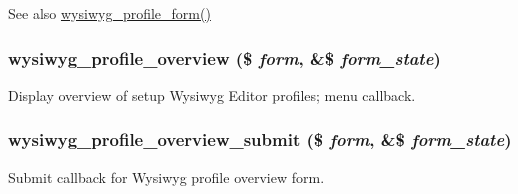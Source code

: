 \begin{DoxySeeAlso}{See also}
\hyperlink{wysiwyg_8admin_8inc_ace4bae87b031fd2ac18d20e909a3bc2c}{wysiwyg\_\-profile\_\-form()} 
\end{DoxySeeAlso}
\hypertarget{wysiwyg_8admin_8inc_a15781b5d635c8e4de52d215a050a2a82}{
\subsubsection[{wysiwyg\_\-profile\_\-overview}]{\setlength{\rightskip}{0pt plus 5cm}wysiwyg\_\-profile\_\-overview (\$ {\em form}, \/  \&\$ {\em form\_\-state})}}
\label{wysiwyg_8admin_8inc_a15781b5d635c8e4de52d215a050a2a82}
Display overview of setup Wysiwyg Editor profiles; menu callback. \hypertarget{wysiwyg_8admin_8inc_a4691b46fc31197d8e1772b9613afb0c5}{
\subsubsection[{wysiwyg\_\-profile\_\-overview\_\-submit}]{\setlength{\rightskip}{0pt plus 5cm}wysiwyg\_\-profile\_\-overview\_\-submit (\$ {\em form}, \/  \&\$ {\em form\_\-state})}}
\label{wysiwyg_8admin_8inc_a4691b46fc31197d8e1772b9613afb0c5}
Submit callback for Wysiwyg profile overview form. 